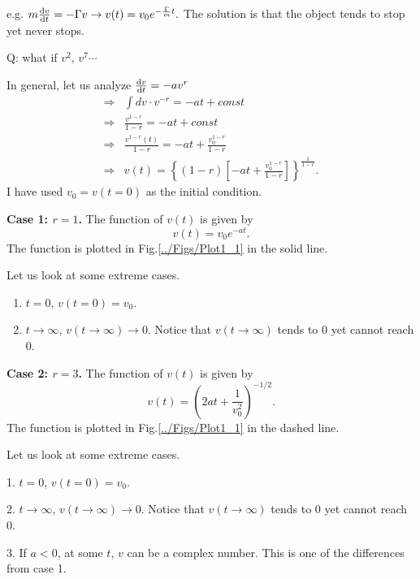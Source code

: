 e.g. $m\frac{{\mathrm d} {v}}{{\mathrm d}t}=-\Gamma v \rightarrow v(t)=v_0e^{-\frac{\Gamma}{m}t}.$ The solution is that the object tends to stop yet never stops.

Q: what if $v^2,\, v^7\cdots$

In general, let us analyze
$\frac{{\mathrm d} {v}}{{\mathrm d}t}=-av^r$
\begin{align}
\Rightarrow & \int{dv\cdot v^{-r}}=-at + const\\
\Rightarrow & \frac{v^{1-r}}{1-r}=-at + const\\
\Rightarrow & \frac{v^{1-r}(t)}{1-r}=-at + \frac{v^{1-r}_0}{1-r}\\
\Rightarrow & v(t)=\left\{ (1-r)\left[ -at + \frac{v^{1-r}_0}{1-r}\right] \right\}^{\frac{1}{1-r}}.
\end{align}
I have used $v_0=v(t=0)$ as the initial condition.

\begin{subsubsection}
  {\textbf{Case 1: $r=1$.}} The function of $v(t)$ is given by
   \begin{equation}
     v(t)=v_0 e^{-at}.
   \end{equation}
   The function is plotted in Fig.\ref{../Figs/Plot1_1} in the solid line.

   Let us look at some extreme cases.

   \begin{enumerate}
    \item $t=0, \, v(t=0)=v_0$.
    \item $t\rightarrow \infty$, $v(t\rightarrow \infty) \rightarrow 0$. Notice that $v(t\rightarrow \infty)$ tends to $0$ yet cannot reach $0$.
   \end{enumerate}

 \end{subsubsection}

 \begin{subsubsection}
  {\textbf{Case 2: $r=3$.}} The function of $v(t)$ is given by
   \begin{equation}
     v(t)=\left(2at+\frac{1}{v_0^2}\right)^{-1/2}.
   \end{equation}
   The function is plotted in Fig.\ref{../Figs/Plot1_1} in the dashed line.

   Let us look at some extreme cases.

   \begin{list}{}{\leftmargin=1cm}
    \item[1.] $t=0$, $v(t=0)=v_0$.
    \item[2.] $t\rightarrow \infty$, $v(t\rightarrow \infty) \rightarrow 0$. Notice that $v(t\rightarrow \infty)$ tends to $0$ yet cannot reach $0$.
    \item[3.] If $a<0$, at some $t$, $v$ can be a complex number. This is one of the differences from case 1.
   \end{list}


 \end{subsubsection}

